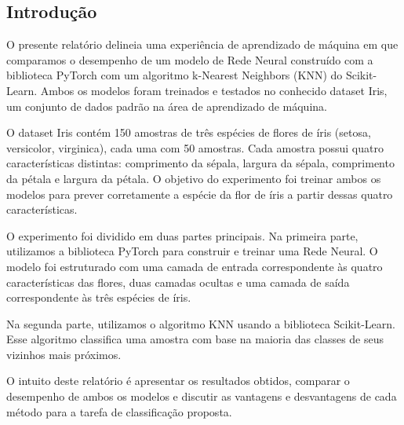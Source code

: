 \begin{multicols}{2}
    \tableofcontents
    \section{Introdução}
    
O presente relatório delineia uma experiência de aprendizado de máquina em que comparamos o desempenho de um modelo de Rede Neural construído com a biblioteca PyTorch com um algoritmo k-Nearest Neighbors (KNN) do Scikit-Learn. Ambos os modelos foram treinados e testados no conhecido dataset Iris, um conjunto de dados padrão na área de aprendizado de máquina.

O dataset Iris contém 150 amostras de três espécies de flores de íris (setosa, versicolor, virginica), cada uma com 50 amostras. Cada amostra possui quatro características distintas: comprimento da sépala, largura da sépala, comprimento da pétala e largura da pétala. O objetivo do experimento foi treinar ambos os modelos para prever corretamente a espécie da flor de íris a partir dessas quatro características.

O experimento foi dividido em duas partes principais. Na primeira parte, utilizamos a biblioteca PyTorch para construir e treinar uma Rede Neural. O modelo foi estruturado com uma camada de entrada correspondente às quatro características das flores, duas camadas ocultas e uma camada de saída correspondente às três espécies de íris.

Na segunda parte, utilizamos o algoritmo KNN usando a biblioteca Scikit-Learn. Esse algoritmo classifica uma amostra com base na maioria das classes de seus vizinhos mais próximos.

O intuito deste relatório é apresentar os resultados obtidos, comparar o desempenho de ambos os modelos e discutir as vantagens e desvantagens de cada método para a tarefa de classificação proposta.
    \end{multicols}